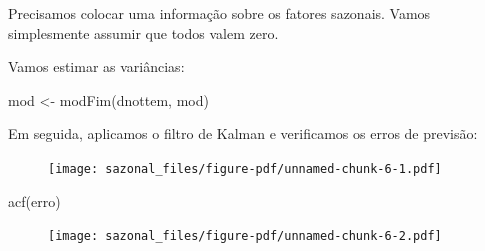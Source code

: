 \documentclass[
  letterpaper,
  DIV=11,
  numbers=noendperiod]{scrreprt}
\newenvironment{Shaded}{\begin{snugshade}}{\end{snugshade}}
\newcommand{\DecValTok}[1]{\textcolor[rgb]{0.68,0.00,0.00}{#1}}
\newcommand{\FunctionTok}[1]{\textcolor[rgb]{0.28,0.35,0.67}{#1}}
\newcommand{\NormalTok}[1]{\textcolor[rgb]{0.00,0.23,0.31}{#1}}
\newcommand{\OtherTok}[1]{\textcolor[rgb]{0.00,0.23,0.31}{#1}}
\newcommand{\SpecialCharTok}[1]{\textcolor[rgb]{0.37,0.37,0.37}{#1}}
\begin{document}
Precisamos colocar uma informação sobre os fatores sazonais. Vamos
simplesmente assumir que todos valem zero.

\begin{Shaded}
\end{Shaded}

Vamos estimar as variâncias:

\begin{Shaded}
\begin{Highlighting}[]
\NormalTok{mod }\OtherTok{\textless{}{-}} \FunctionTok{modFim}\NormalTok{(dnottem, mod)}
\end{Highlighting}
\end{Shaded}

Em seguida, aplicamos o filtro de Kalman e verificamos os erros de
previsão:

\begin{Shaded}
\end{Shaded}

\begin{figure}[H]

{\centering \texttt{[image: sazonal\_files/figure-pdf/unnamed-chunk-6-1.pdf]}

}

\end{figure}

\begin{Shaded}
\begin{Highlighting}[]
\FunctionTok{acf}\NormalTok{(erro)}
\end{Highlighting}
\end{Shaded}

\begin{figure}[H]

{\centering \texttt{[image: sazonal\_files/figure-pdf/unnamed-chunk-6-2.pdf]}

}

\end{figure}
\end{document}
